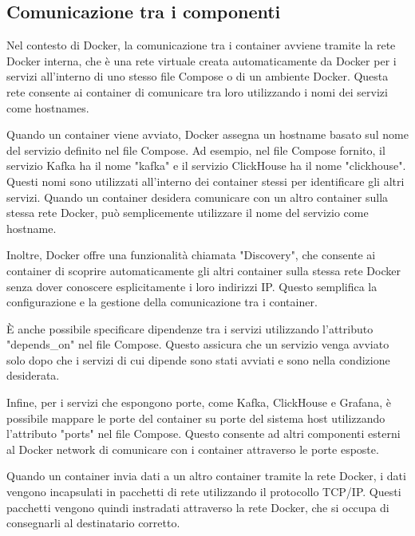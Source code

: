 \subsection{Comunicazione tra i componenti}
Nel contesto di Docker, la comunicazione tra i container avviene tramite la rete Docker interna, che è una rete virtuale creata automaticamente da Docker per i servizi all'interno di uno stesso file Compose o di un ambiente Docker. Questa rete consente ai container di comunicare tra loro utilizzando i nomi dei servizi come hostnames.

Quando un container viene avviato, Docker assegna un hostname basato sul nome del servizio definito nel file Compose. Ad esempio, nel file Compose fornito, il servizio Kafka ha il nome "kafka" e il servizio ClickHouse ha il nome "clickhouse". Questi nomi sono utilizzati all'interno dei container stessi per identificare gli altri servizi. Quando un container desidera comunicare con un altro container sulla stessa rete Docker, può semplicemente utilizzare il nome del servizio come hostname.

Inoltre, Docker offre una funzionalità chiamata "Discovery", che consente ai container di scoprire automaticamente gli altri container sulla stessa rete Docker senza dover conoscere esplicitamente i loro indirizzi IP. Questo semplifica la configurazione e la gestione della comunicazione tra i container.

È anche possibile specificare dipendenze tra i servizi utilizzando l'attributo "depends\_on" nel file Compose. Questo assicura che un servizio venga avviato solo dopo che i servizi di cui dipende sono stati avviati e sono nella condizione desiderata.

Infine, per i servizi che espongono porte, come Kafka, ClickHouse e Grafana, è possibile mappare le porte del container su porte del sistema host utilizzando l'attributo "ports" nel file Compose. Questo consente ad altri componenti esterni al Docker network di comunicare con i container attraverso le porte esposte.

Quando un container invia dati a un altro container tramite la rete Docker, i dati vengono incapsulati in pacchetti di rete utilizzando il protocollo TCP/IP. Questi pacchetti vengono quindi instradati attraverso la rete Docker, che si occupa di consegnarli al destinatario corretto.

